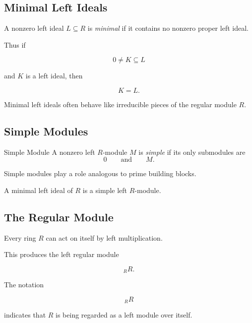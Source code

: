\subsection{Minimal Left Ideals}
\label{subsec:minimal-left-ideals}

A nonzero left ideal \(L\subseteq R\) is \emph{minimal} if it contains no
nonzero proper left ideal.

Thus if

\[ 0\neq K\subseteq L \]

and \(K\) is a left ideal, then

\[ K=L. \]

Minimal left ideals often behave like irreducible pieces of the regular
module \(R\).

\subsection{Simple Modules}
\label{subsec:simple-modules}

\begin{definitionbox}{Simple Module}
A nonzero left \(R\)-module \(M\) is \emph{simple} if its only submodules are
\[ 0\qquad\text{and}\qquad M. \]
\end{definitionbox}

Simple modules play a role analogous to prime building blocks.

A minimal left ideal of \(R\) is a simple left \(R\)-module.

\subsection{The Regular Module}
\label{subsec:regular-module}

Every ring \(R\) can act on itself by left multiplication.

This produces the left regular module

\[ {}_RR. \]

The notation

\[ {}_RR \]

indicates that \(R\) is being regarded as a left module over itself.

